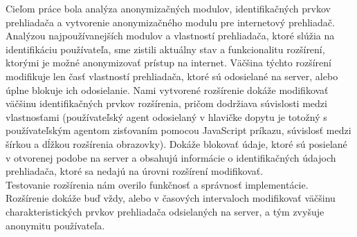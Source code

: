 Cieľom práce bola analýza anonymizačných modulov, identifikačných prvkov prehliadača a vytvorenie anonymizačného modulu pre internetový prehliadač.\\
\indent Analýzou najpoužívanejších modulov a vlastností prehliadača, ktoré slúžia na identifikáciu používateľa, sme zistili aktuálny stav a funkcionalitu rozšírení, ktorými je možné anonymizovať prístup na internet. Väčšina týchto rozšírení modifikuje len časť vlastností prehliadača, ktoré sú odosielané na server, alebo úplne blokuje ich odosielanie. Nami vytvorené rozšírenie dokáže modifikovať väčšinu identifikačných prvkov rozšírenia, pričom dodržiava súvislosti medzi vlastnosťami (používateľský agent odosielaný v hlavičke dopytu je totožný s používateľským agentom zisťovaním pomocou JavaScript príkazu, súvislosť medzi šírkou a dĺžkou rozšírenia obrazovky). Dokáže blokovať údaje, ktoré sú posielané v otvorenej podobe na server a obsahujú informácie o identifikačných údajoch prehliadača, ktoré sa nedajú na úrovni rozšírení modifikovať. \\
\indent Testovanie rozšírenia nám overilo funkčnosť a správnosť implementácie. Rozšírenie dokáže buď vždy, alebo v časových intervaloch modifikovať väčšinu charakteristických prvkov prehliadača odsielaných na server, a tým zvyšuje anonymitu používateľa. 
